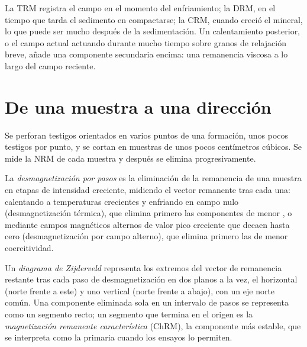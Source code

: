 La TRM registra el campo en el momento del enfriamiento; la DRM, en el tiempo que
tarda el sedimento en compactarse; la CRM, cuando creció el mineral, lo que puede ser mucho
después de la sedimentación. Un calentamiento posterior, o el campo actual actuando durante mucho tiempo
sobre granos de relajación breve, añade una componente secundaria encima: una
remanencia viscosa a lo largo del campo reciente.

\section{De una muestra a una dirección}

Se perforan testigos orientados en varios puntos de una formación, unos pocos testigos por
punto, y se cortan en muestras de unos pocos centímetros cúbicos. Se mide la NRM de cada muestra
y después se elimina progresivamente.

\begin{definition}\label{def:b3:palaeomagnetism:demag}
La \emph{desmagnetización por pasos} es la eliminación
de la remanencia de una muestra en etapas de intensidad creciente, midiendo el
vector remanente tras cada una: calentando a temperaturas crecientes y enfriando
en campo nulo (desmagnetización térmica), que elimina primero las componentes de
menor , o mediante campos magnéticos alternos de valor pico creciente
que decaen hasta cero (desmagnetización por campo alterno), que elimina primero
las de menor coercitividad.
\end{definition}

\begin{definition}\label{def:b3:palaeomagnetism:zijderveld}
Un \emph{diagrama de Zijderveld} representa los extremos del
vector de remanencia restante tras cada paso de desmagnetización en dos planos
a la vez, el horizontal (norte frente a este) y uno vertical (norte
frente a abajo), con un eje norte común. Una componente eliminada sola en un intervalo
de pasos se representa como un segmento recto; un segmento que termina en el origen es la
\emph{magnetización remanente característica}
(ChRM), la componente más estable, que se interpreta como la primaria
cuando los ensayos lo permiten.
\end{definition}


